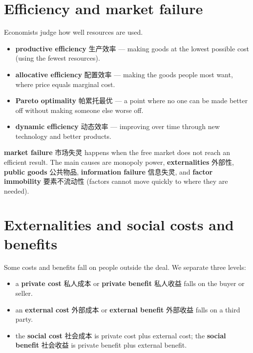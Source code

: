 \documentclass[11pt]{article}
\begin{document}
\section*{Efficiency and market failure}

Economists judge how well resources are used.

\begin{itemize}
\item \textbf{productive efficiency} 生产效率 — making goods at the lowest possible cost (using the fewest resources).

\item \textbf{allocative efficiency} 配置效率 — making the goods people most want, where price equals marginal cost.

\item \textbf{Pareto optimality} 帕累托最优 — a point where no one can be made better off without making someone else worse off.

\item \textbf{dynamic efficiency} 动态效率 — improving over time through new technology and better products.

\end{itemize}

\textbf{market failure} 市场失灵 happens when the free market does not reach an efficient result. The main causes are monopoly power, \textbf{externalities} 外部性, \textbf{public goods} 公共物品, \textbf{information failure} 信息失灵, and \textbf{factor immobility} 要素不流动性 (factors cannot move quickly to where they are needed).

\section*{Externalities and social costs and benefits}

Some costs and benefits fall on people outside the deal. We separate three levels:

\begin{itemize}
\item a \textbf{private cost} 私人成本 or \textbf{private benefit} 私人收益 falls on the buyer or seller.

\item an \textbf{external cost} 外部成本 or \textbf{external benefit} 外部收益 falls on a third party.

\item the \textbf{social cost} 社会成本 is private cost plus external cost; the \textbf{social benefit} 社会收益 is private benefit plus external benefit.

\end{itemize}
\end{document}
